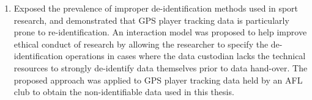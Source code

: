 \begin{enumerate}
  \item Exposed the prevalence of improper de-identification methods used in sport research, and demonstrated that GPS player tracking data is particularly prone to re-identification. An interaction model was proposed to help improve ethical conduct of research by allowing the researcher to specify the de-identification operations in cases where the data custodian lacks the technical resources to strongly de-identify data themselves prior to data hand-over. The proposed approach was applied to GPS player tracking data held by an AFL club to obtain the non-identifiable data used in this thesis.
\end{enumerate}
